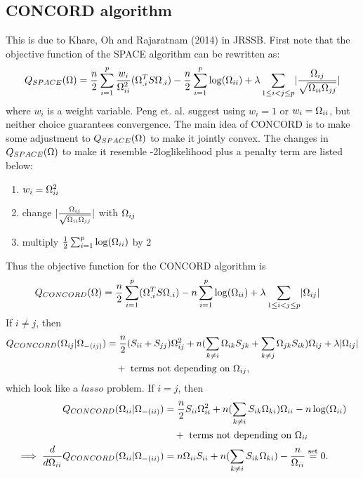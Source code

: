 \documentclass[12pt, leqno]{article}
\providecommand{\abs}[1]{\lvert#1\rvert}
\def\om{\ensuremath\Omega}
\begin{document}
\subsection{CONCORD algorithm} This is due to Khare, Oh and
Rajaratnam (2014) in JRSSB. First note that the objective function of
the SPACE algorithm can be rewritten as:
\begin{align*}
Q_{SPACE}(\om) = \frac{n}{2} \sum_{i=1}^p
  \frac{w_i}{\om_{ii}^2}(\om_{.i}^TS \om_{.i}) - \frac{n}{2}
  \sum_{i=1}^p \log (\om_{ii}) + \lambda \sum_{1 \leq i < j \leq p} \abs{\frac{\om_{ij}}{\sqrt{\om_{ii}\om_{jj}}}}
\end{align*}
where $w_i$ is a weight variable. Peng et. al. suggest using $w_i = 1$
or $w_i = \om_{ii}$, but neither choice guarantees convergence. 
The main idea of CONCORD is to make some adjustment to
$Q_{SPACE}(\om)$ to make it jointly convex. The changes in
$Q_{SPACE}(\om)$ to make it resemble -2loglikelihood plus a  penalty term
are listed below:
\begin{enumerate}
\item $w_i = \om_{ii}^2$
\item change $\abs{\frac{\om_{ij}}{\sqrt{\om_{ii}\om_{jj}}}}$ with $\om_{ij}$
\item multiply $\frac{1}{2}
  \sum_{i=1}^p \log (\om_{ii})$ by 2
\end{enumerate}
Thus the objective function for the CONCORD algorithm is
\begin{align*}
Q_{CONCORD}(\om) &= \frac{n}{2}\sum_{i=1}^p
  (\om_{.i}^TS \om_{.i}) - 
   n \sum_{i=1}^p \log (\om_{ii}) + \lambda \sum_{1 \leq i < j \leq p}
  \abs{\om_{ij}} 
\end{align*}
If $i \not= j$, then 
\begin{align*}
Q_{CONCORD}(\om_{ij}|\om_{-(ij)}) &= \frac{n}{2} (S_{ii}+S_{jj})\om_{ij}^2 +
                                    n (\sum_{k\not=i} \om_{ik}S_{jk} +
                                    \sum_{k\not=j} \om_{jk}S_{ik})
                                    \om_{ij} + \lambda \abs{\om_{ij}}
  \\
&\quad + \text{ terms not depending on } \om_{ij},
\end{align*}
which look like a $lasso$ problem.
If $i = j$, then 
\begin{align*}
Q_{CONCORD}(\om_{ii}|\om_{-(ii)}) &= \frac{n}{2}
                                    S_{ii}\om_{ii}^2+n(\sum_{k\not=i}
                                    S_{ik}\om_{ki} )\om_{ii} -  n\log(\om_{ii}) \\
&\quad +  \text{ terms not depending on } \om_{ii} \\
\implies \frac{d}{d\om_{ii}} Q_{CONCORD}(\om_{ii}|\om_{-(ii)}) &=
                                                                 n\om_{ii}S_{ii}+
                                                                 n(\sum_{k\not=i}
                                                                 S_{ik}\om_{ki})
                                                                 -\frac{n}{\om_{ii}} 
                                                                 \overset{\text{set}}{=}0.
\end{align*}
\end{document}
